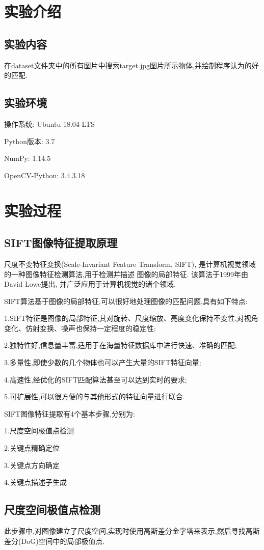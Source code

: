 \documentclass[a4paper]{article}
\begin{document}
    \begingroup
    \hypersetup{linkcolor=black}
    \tableofcontents
    \endgroup
    \newpage
    \section{实验介绍}
        \subsection{实验内容}
在dataset文件夹中的所有图片中搜索target.jpg图片所示物体,并绘制程序认为的好的匹配.
        \subsection{实验环境}
操作系统: Ubuntu 18.04 LTS

Python版本: 3.7

NumPy: 1.14.5

OpenCV-Python: 3.4.3.18
    \newpage
    \section{实验过程}
        \subsection{SIFT图像特征提取原理}
尺度不变特征变换(Scale-Invariant Feature Transform, SIFT), 是计算机视觉领域的一种图像特征检测算法,用于检测并描述
图像的局部特征. 该算法于1999年由David Lowe提出, 并广泛应用于计算机视觉的诸个领域.

SIFT算法基于图像的局部特征,可以很好地处理图像的匹配问题,具有如下特点:

1.SIFT特征是图像的局部特征,其对旋转、尺度缩放、亮度变化保持不变性,对视角变化、仿射变换、噪声也保持一定程度的稳定性;

2.独特性好,信息量丰富,适用于在海量特征数据库中进行快速、准确的匹配;

3.多量性,即使少数的几个物体也可以产生大量的SIFT特征向量;

4.高速性,经优化的SIFT匹配算法甚至可以达到实时的要求;

5.可扩展性,可以很方便的与其他形式的特征向量进行联合.

SIFT图像特征提取有4个基本步骤,分别为:

1.尺度空间极值点检测

2.关键点精确定位

3.关键点方向确定

4.关键点描述子生成
        \subsection{尺度空间极值点检测}
此步骤中,对图像建立了尺度空间,实现时使用高斯差分金字塔来表示,然后寻找高斯差分(DoG)空间中的局部极值点.
\end{document}
